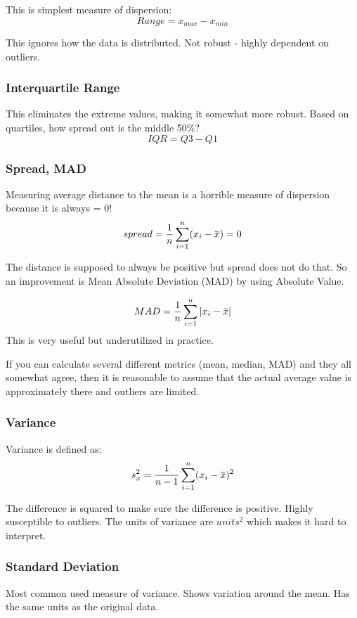 \documentclass[11pt, oneside]{article}   	%
\newcommand{\overbar}[1]{\mkern 1.5mu\overline{\mkern-1.5mu#1\mkern-1.5mu}\mkern 1.5mu}
\begin{document}
This is simplest measure of dispersion: 
\[
Range = x_{max} - x_{min}
\]

This ignores how the data is distributed. Not robust - highly dependent on outliers.

\subsubsection{Interquartile Range}

This eliminates the extreme values, making it somewhat more robust. Based on quartiles, how spread out is the middle 50\%?
\[
IQR = Q3 - Q1
\]

\subsubsection{Spread, MAD}

Measuring average distance to the mean is a horrible measure of dispersion because it is always = 0! 
\[
spread = \frac{1}{n} \sum\limits_{i=1}^n (x_i - \overbar{x}) = 0
\]

The distance is supposed to always be positive but spread does not do that. So an improvement is Mean Absolute Deviation (MAD) by using Absolute Value.

\[
MAD = \frac{1}{n} \sum\limits_{i=1}^n | x_i - \overbar{x} |
\]
This is very useful but underutilized in practice.

If you can calculate several different metrics (mean, median, MAD) and they all somewhat agree, then it is reasonable to assume that the actual average value is approximately there and outliers are limited.

\subsubsection{Variance}
Variance is defined as:
\[
s^2_x = \frac{1}{n-1} \sum\limits_{i=1}^n (x_i - \overbar{x})^2
\]

The difference is squared to make sure the difference is positive. Highly susceptible to outliers. The units of variance are $units^2$ which makes it hard to interpret.

\subsubsection{Standard Deviation}

Most common used measure of variance. Shows variation around the mean. Has the same units as the original data.
\end{document}
